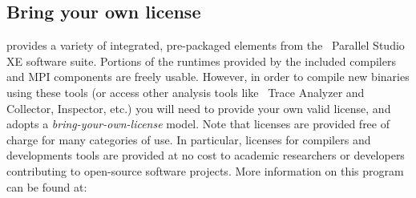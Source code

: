 \subsection{Bring your own license} \label{sec:byol}
\OHPC{} provides a variety of integrated, pre-packaged elements from the
\IntelR{}~Parallel Studio XE software suite. Portions of the runtimes provided
by the included compilers and MPI components are freely usable. However, in
order to compile new binaries using these tools (or access other analysis tools
like \IntelR{}~Trace Analyzer and Collector, \IntelR{} Inspector, etc.) you
will need to provide your own valid license, and \OHPC{} adopts a {\em
 bring-your-own-license} model. Note that licenses are provided free of
charge for many categories of use. In particular, licenses for compilers and
developments tools are provided at no cost to academic researchers or
developers contributing to open-source software projects. More information on
this program can be found at: 

\begin{center}
\href{https://software.intel.com/en-us/qualify-for-free-software}
     {\color{blue}{https://software.intel.com/en-us/qualify-for-free-software}}
\end{center}

